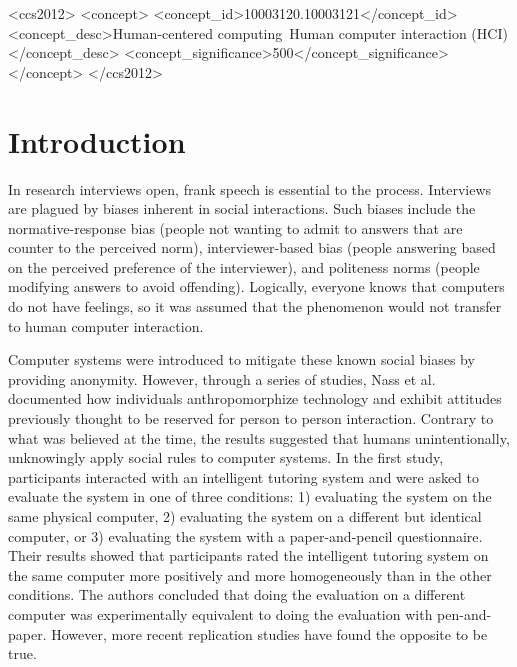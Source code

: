 \documentclass{sig-alternate-05-2015}
\begin{document}
%
%
\begin{CCSXML}
<ccs2012>
<concept>
<concept_id>10003120.10003121</concept_id>
<concept_desc>Human-centered computing~Human computer interaction (HCI)</concept_desc>
<concept_significance>500</concept_significance>
</concept>
</ccs2012>
\end{CCSXML}


%
%
\printccsdesc


\section{Introduction}
In research interviews open, frank speech is essential to the process. Interviews are plagued by biases inherent in social interactions. Such biases include the normative-response bias (people not wanting to admit to answers that are counter to the perceived norm), interviewer-based bias (people answering based on the perceived preference of the interviewer), and politeness norms (people modifying answers to avoid offending). Logically, everyone knows that computers do not have feelings, so it was assumed that the phenomenon would not transfer to human computer interaction. 

Computer systems were introduced to mitigate these known social biases by providing anonymity.  However, through a series of studies, Nass et al. documented how individuals anthropomorphize technology and exhibit attitudes previously thought to be reserved for person to person interaction\cite{nass1999people}\cite{reeves1996people}. Contrary to what was believed at the time, the results suggested that humans unintentionally, unknowingly apply social rules to computer systems.  In the first study, participants interacted with an intelligent tutoring system and were asked to evaluate the system in one of three conditions: 1) evaluating the system on the same physical computer, 2) evaluating the system on a different but identical computer, or 3) evaluating the system with a paper-and-pencil questionnaire. Their results showed that participants rated the intelligent tutoring system on the same computer more positively and more homogeneously than in the other conditions. The authors concluded that doing the evaluation on a different computer was experimentally equivalent to doing the evaluation with pen-and-paper.  However, more recent replication studies have found the opposite to be true\cite{gownivaripalli}.
\end{document}
